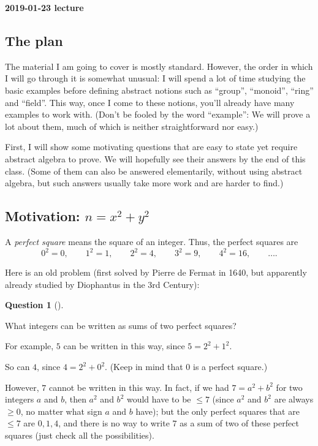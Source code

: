 \documentclass[numbers=enddot,12pt,final,onecolumn,notitlepage]{scrartcl}%
\numberwithin{exer}{section}
\theoremstyle{definition}
\newtheorem{quest}[theo]{Question}
\newenvironment{question}[1][]
{\begin{quest}[#1]\begin{leftbar}}
{\end{leftbar}\end{quest}}
\newenvironment{question}[1][Question]{\noindent\textbf{#1.} }{\ \rule{0.5em}{0.5em}}
\begin{document}
\begin{center}
\textbf{2019-01-23 lecture}
\end{center}

\subsection{The plan}

The material I am going to cover is mostly standard. However, the order in
which I will go through it is somewhat unusual: I will spend a lot of time
studying the basic examples before defining abstract notions such as
``group'', ``monoid'', ``ring'' and ``field''. This way, once I come to these
notions, you'll already have many examples to work with. (Don't be fooled by
the word ``example'': We will prove a lot about them, much of which is neither
straightforward nor easy.)

First, I will show some motivating questions that are easy to state yet
require abstract algebra to prove. We will hopefully see their answers by the
end of this class. (Some of them can also be answered elementarily, without
using abstract algebra, but such answers usually take more work and are harder
to find.)

\subsection{\label{subsect.intro.sum-of-2sq}Motivation: $n=x^{2}+y^{2}$}

A \textit{perfect square} means the square of an integer. Thus, the perfect
squares are
\[
0^{2} = 0, \qquad1^{2} = 1, \qquad2^{2} = 4, \qquad3^{2} = 9, \qquad4^{2} =
16, \qquad\ldots.
\]


Here is an old problem (first solved by Pierre de Fermat in 1640, but
apparently already studied by Diophantus in the 3rd Century):

\begin{question}
\label{quest.intro.sum-of-2sq.1} What integers can be written as sums of two
perfect squares?
\end{question}

For example, $5$ can be written in this way, since $5=2^{2}+1^{2}$.

So can $4$, since $4=2^{2}+0^{2}$. (Keep in mind that $0$ is a perfect square.)

However, $7$ cannot be written in this way. In fact, if we had $7 = a^{2} +
b^{2}$ for two integers $a$ and $b$, then $a^{2}$ and $b^{2}$ would have to be
$\leq7$ (since $a^{2}$ and $b^{2}$ are always $\geq0$, no matter what sign $a$
and $b$ have); but the only perfect squares that are $\leq7$ are $0,1,4$, and
there is no way to write $7$ as a sum of two of these perfect squares (just
check all the possibilities).
\end{document}
